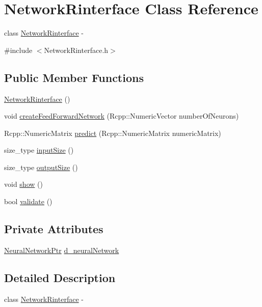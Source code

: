 \hypertarget{class_network_rinterface}{
\section{NetworkRinterface Class Reference}
\label{class_network_rinterface}
}


class \hyperlink{class_network_rinterface}{NetworkRinterface} -\/  




{\ttfamily \#include $<$NetworkRinterface.h$>$}

\subsection*{Public Member Functions}
\begin{DoxyCompactItemize}
\item 
\hyperlink{class_network_rinterface_afcfa99fcf4ce5b5a0a3a18a0b7fd1b9c}{NetworkRinterface} ()
\item 
void \hyperlink{class_network_rinterface_aa2a5e2b5605382da022dd0f277f0a73f}{createFeedForwardNetwork} (Rcpp::NumericVector numberOfNeurons)
\item 
Rcpp::NumericMatrix \hyperlink{class_network_rinterface_a28c63ea70e49d8771e8242107b65d62c}{predict} (Rcpp::NumericMatrix numericMatrix)
\item 
size\_\-type \hyperlink{class_network_rinterface_ae82e946eb0ad4fc532803ee2e34d4e08}{inputSize} ()
\item 
size\_\-type \hyperlink{class_network_rinterface_a4e5243781bd453c3abd2baea0713f7dc}{outputSize} ()
\item 
void \hyperlink{class_network_rinterface_a3bcc22e2278cc28157b807ac190c7787}{show} ()
\item 
bool \hyperlink{class_network_rinterface_a1b37bfff06e29aedd525fa25137b94e1}{validate} ()
\end{DoxyCompactItemize}
\subsection*{Private Attributes}
\begin{DoxyCompactItemize}
\item 
\hyperlink{_a_m_o_r_e_8h_a7adadf1c313313507b00cd1193db29a1}{NeuralNetworkPtr} \hyperlink{class_network_rinterface_a841abcde82202671c51525b61ce6a47d}{d\_\-neuralNetwork}
\end{DoxyCompactItemize}


\subsection{Detailed Description}
class \hyperlink{class_network_rinterface}{NetworkRinterface} -\/ 

